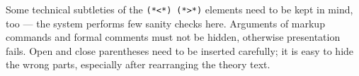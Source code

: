 \begin{isabellebody}
\begin{isamarkuptext}
%

  \medskip Some technical subtleties of the
  \verb,(,\verb,*,\verb,<,\verb,*,\verb,),~\verb,(,\verb,*,\verb,>,\verb,*,\verb,),
  elements need to be kept in mind, too --- the system performs few
  sanity checks here.  Arguments of markup commands and formal
  comments must not be hidden, otherwise presentation fails.  Open and
  close parentheses need to be inserted carefully; it is easy to hide
  the wrong parts, especially after rearranging the theory text.%
\end{isamarkuptext}%
\isamarkuptrue%
\isamarkupfalse%
\end{isabellebody}%
